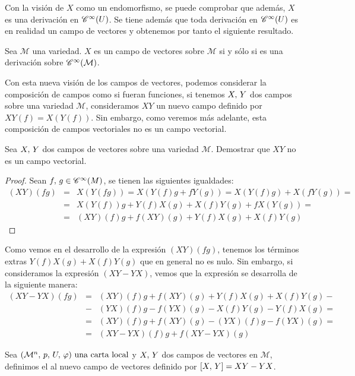 Con la visión de $X$ como un endomorfismo, se puede comprobar que además, $X$ es una derivación en $\mathscr{C}^\infty(U)$.
Se tiene además que toda derivación en $\mathscr{C}^\infty(U)$ es en realidad un campo de vectores y obtenemos por tanto el
siguiente resultado.

\begin{result}
	\label{pro:campo-vectores-derivacion}
	Sea $\mathcal{M}$ una variedad. $X$ es un campo de vectores sobre $\mathcal{M}$ si y sólo si es una derivación
	sobre $\mathscr{C}^\infty(\mathcal{M})$.
\end{result}

Con esta nueva visión de los campos de vectores, podemos considerar la composición de campos como si fueran funciones,
si tenemos $X,\thinspace Y$ dos campos sobre una variedad $\mathcal{M}$, consideramos $XY$ un nuevo campo definido por $XY
(f)=X(Y(f))$.
Sin embargo, como veremos más adelante, esta composición de campos vectoriales no es un campo vectorial.

\begin{exercise}
	Sea $X,\thinspace Y$ dos campos de vectores sobre una variedad $\mathcal{M}$. Demostrar que $XY$ no es un campo vectorial.
\end{exercise}
\begin{proof}
	Sean $f,\thinspace g\in\mathscr{C}^\infty(M)$, se tienen las siguientes igualdades:
	\begin{eqnarray*}
		(XY)(fg) & = & X(Y(fg)) = X(Y(f)g+fY(g)) = X(Y(f)g)+X(fY(g))=\\
		& = & X(Y(f))g+Y(f)X(g)+X(f)Y(g)+fX(Y(g)) = \\
		& = & (XY)(f)g+f(XY)(g)+Y(f)X(g)+X(f)Y(g)
	\end{eqnarray*}
\end{proof}

Como vemos en el desarrollo de la expresión $(XY)(fg)$, tenemos los términos extras $Y(f)X(g)+X(f)Y(g)$ que en
general no es nulo.
Sin embargo, si consideramos la expresión $(XY-YX)$, vemos que la expresión se desarrolla de la siguiente manera:
\begin{eqnarray*}
	(XY-YX)(fg) & = & (XY)(f)g+f(XY)(g)+Y(f)X(g)+X(f)Y(g) - \\
	& - & (YX)(f)g-f(YX)(g)-X(f)Y(g)-Y(f)X(g) = \\
	& = & (XY)(f)g+f(XY)(g) - (YX)(f)g-f(YX)(g) = \\
	& = & (XY-YX)(f)g+ f(XY-YX)(g)
\end{eqnarray*}


\begin{definition}
	Sea $(\mathcal{M}^n,\thinspace p,\thinspace U,\thinspace \varphi)\textmd{ una carta local}$ y $X,\thinspace Y$ dos campos de vectores en $\mathcal{M}$, definimos el  al nuevo campo de vectores definido por $[X,\thinspace Y]=XY-YX$.
\end{definition}

